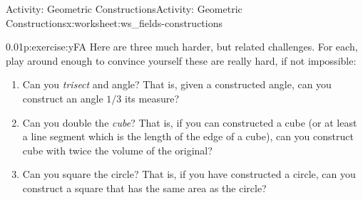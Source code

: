 \documentclass[11pt]{book}
\begin{document}
\begin{worksheet-subsection}{Activity: Geometric Constructions}{}{Activity: Geometric Constructions}{}{}{x:worksheet:ws_fields-constructions}
\begin{divisionexercise}{4}{}{0.01}{p:exercise:yFA}
Here are three much harder, but related challenges.  For each, play around enough to convince yourself these are really hard, if not impossible:%
\begin{enumerate}[label=(\alph*)]
\item{}Can you \emph{trisect} and angle?  That is, given a constructed angle, can you construct an angle \(1/3\) its measure?%
\item{}Can you double the \emph{cube}?  That is, if you can constructed a cube (or at least a line segment which is the length of the edge of a cube), can you construct cube with twice the volume of the original?%
\item{}Can you square the circle?  That is, if you have constructed a circle, can you construct a square that has the same area as the circle?%
\end{enumerate}
%
\end{divisionexercise}%
\end{worksheet-subsection}
\restoregeometry
\end{document}
